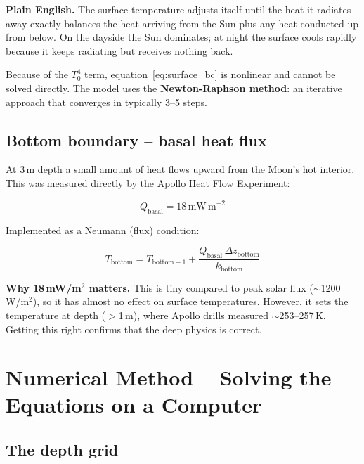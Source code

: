 \documentclass[12pt, a4paper]{article}
\begin{document}
\begin{plainbox}
  \textbf{Plain English.}
  The surface temperature adjusts itself until the heat it radiates
  away exactly balances the heat arriving from the Sun plus any
  heat conducted up from below.
  On the dayside the Sun dominates; at night the surface cools
  rapidly because it keeps radiating but receives nothing back.
\end{plainbox}

Because of the $T_0^4$ term, equation~\eqref{eq:surface_bc} is
nonlinear and cannot be solved directly.
The model uses the \textbf{Newton-Raphson method}: an iterative
approach that converges in typically 3--5 steps.

\subsection{Bottom boundary -- basal heat flux}

At 3\,m depth a small amount of heat flows upward from the Moon's
hot interior.
This was measured directly by the Apollo Heat Flow Experiment:

\begin{equation}
  Q_{\mathrm{basal}} = 18\,\mathrm{mW\,m}^{-2}
  \label{eq:basal}
\end{equation}

Implemented as a Neumann (flux) condition:

\begin{equation}
  T_{\mathrm{bottom}} = T_{\mathrm{bottom}-1}
    + \frac{Q_{\mathrm{basal}}\,\Delta z_{\mathrm{bottom}}}{k_{\mathrm{bottom}}}
  \label{eq:bottom_bc}
\end{equation}

\begin{plainbox}
  \textbf{Why 18\,mW/m$^2$ matters.}
  This is tiny compared to peak solar flux ($\sim$1200\,W/m$^2$),
  so it has almost no effect on surface temperatures.
  However, it sets the temperature at depth ($>$1\,m), where
  Apollo drills measured $\sim$253--257\,K.
  Getting this right confirms that the deep physics is correct.
\end{plainbox}

\section{Numerical Method -- Solving the Equations on a Computer}

\subsection{The depth grid}
\end{document}
